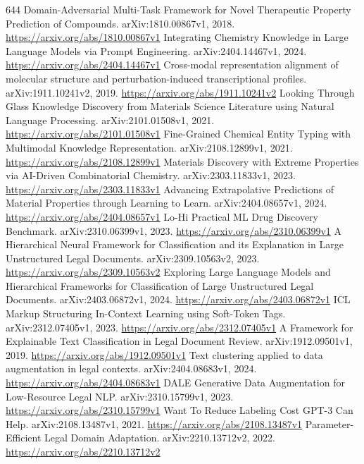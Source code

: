 \documentclass[11pt]{article}
\begin{document}
\begin{thebibliography}{644}
 Domain-Adversarial Multi-Task Framework for Novel Therapeutic Property Prediction of Compounds. arXiv:1810.00867v1, 2018. \url{https://arxiv.org/abs/1810.00867v1}
 Integrating Chemistry Knowledge in Large Language Models via Prompt Engineering. arXiv:2404.14467v1, 2024. \url{https://arxiv.org/abs/2404.14467v1}
 Cross-modal representation alignment of molecular structure and perturbation-induced transcriptional profiles. arXiv:1911.10241v2, 2019. \url{https://arxiv.org/abs/1911.10241v2}
 Looking Through Glass Knowledge Discovery from Materials Science Literature using Natural Language Processing. arXiv:2101.01508v1, 2021. \url{https://arxiv.org/abs/2101.01508v1}
 Fine-Grained Chemical Entity Typing with Multimodal Knowledge Representation. arXiv:2108.12899v1, 2021. \url{https://arxiv.org/abs/2108.12899v1}
 Materials Discovery with Extreme Properties via AI-Driven Combinatorial Chemistry. arXiv:2303.11833v1, 2023. \url{https://arxiv.org/abs/2303.11833v1}
 Advancing Extrapolative Predictions of Material Properties through Learning to Learn. arXiv:2404.08657v1, 2024. \url{https://arxiv.org/abs/2404.08657v1}
 Lo-Hi Practical ML Drug Discovery Benchmark. arXiv:2310.06399v1, 2023. \url{https://arxiv.org/abs/2310.06399v1}
 A Hierarchical Neural Framework for Classification and its Explanation in Large Unstructured Legal Documents. arXiv:2309.10563v2, 2023. \url{https://arxiv.org/abs/2309.10563v2}
 Exploring Large Language Models and Hierarchical Frameworks for Classification of Large Unstructured Legal Documents. arXiv:2403.06872v1, 2024. \url{https://arxiv.org/abs/2403.06872v1}
 ICL Markup Structuring In-Context Learning using Soft-Token Tags. arXiv:2312.07405v1, 2023. \url{https://arxiv.org/abs/2312.07405v1}
 A Framework for Explainable Text Classification in Legal Document Review. arXiv:1912.09501v1, 2019. \url{https://arxiv.org/abs/1912.09501v1}
 Text clustering applied to data augmentation in legal contexts. arXiv:2404.08683v1, 2024. \url{https://arxiv.org/abs/2404.08683v1}
 DALE Generative Data Augmentation for Low-Resource Legal NLP. arXiv:2310.15799v1, 2023. \url{https://arxiv.org/abs/2310.15799v1}
 Want To Reduce Labeling Cost GPT-3 Can Help. arXiv:2108.13487v1, 2021. \url{https://arxiv.org/abs/2108.13487v1}
 Parameter-Efficient Legal Domain Adaptation. arXiv:2210.13712v2, 2022. \url{https://arxiv.org/abs/2210.13712v2}

\end{thebibliography}
\end{document}
